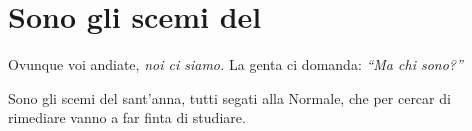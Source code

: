 \section{Sono gli scemi del \santanna}
\begin{canzone}
Ovunque voi andiate, {\raggedleft \textit{noi ci siamo.}}
La genta ci domanda: {\raggedleft \textit{“Ma chi sono?”}}

Sono gli scemi del sant'anna,
tutti segati alla Normale,
che per cercar di rimediare
vanno a far finta di studiare.
\end{canzone}
